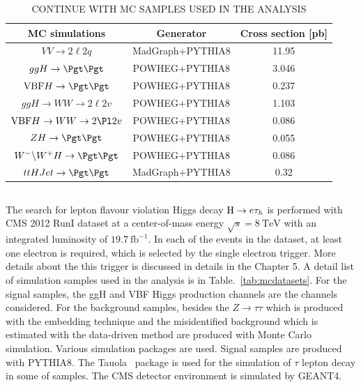 \begin{table}[!hbpt]
\caption{CONTINUE WITH MC SAMPLES USED IN THE ANALYSIS}
\begin{center}
\begin{tabular}{|c|c|c|}
\hline
MC simulations & Generator & Cross section [pb] \\\hline
$VV \to2\ell 2 q$                                        &  MadGraph+PYTHIA8   &  11.95  \\\hline
$ggH\to \Pgt\Pgt $                                      & POWHEG+PYTHIA8 &      3.046\\\hline
$\textrm{VBF}H\to \Pgt\Pgt $                     & POWHEG+PYTHIA8 &      0.237\\\hline
$ggH\to WW \to 2\ell 2v$                            & POWHEG+PYTHIA8 &      1.103\\\hline
$\textrm{VBF}H\to WW\to 2\Pl 2v$             & POWHEG+PYTHIA8 &    0.086\\\hline
$ZH \to \Pgt\Pgt$                                        & POWHEG+PYTHIA8 &    0.055\\\hline  
$W^{-}\backslash W^{+} H\to\Pgt\Pgt$        & POWHEG+PYTHIA8 &    0.086\\\hline 
$ttHJet \to \Pgt\Pgt$                                   &MadGraph+PYTHIA8&     0.32\\\hline   
\end{tabular}
\end{center}
\label{tab:mutaumcsamples2}
\end{table}


\subsection{\Hehad}

The search for lepton flavour violation Higgs decay $\mathrm{H} \to e \tau_{h}$  is performed with CMS 2012 RunI dataset at a center-of-mass energy  $\sqrt{s}=8 ~\textrm{TeV}$ with an integrated luminosity of $19.7 ~\textrm{fb}^{-1}$. In each of the events in the dataset, at least one electron is required, which is selected by the single electron trigger. More details about the this trigger is discussed in details in the Chapter 5. A detail list of simulation samples used in the analysis is in Table.~\ref{tab:mcdatasets}.  For the signal samples, the ggH and VBF Higgs production channels are the channels considered. For the background samples, besides the $Z\to \tau \tau$ which is produced with the embedding technique and the misidentified background which is estimated with the data-driven method are produced with Monte Carlo simulation. Various simulation packages are used. Signal samples are produced with PYTHIA8. The Tauola~\cite{Simulation:Tauola} package is used for the simulation of $\tau$ lepton decay in some of samples. The CMS detector environment is simulated by GEANT4. 



